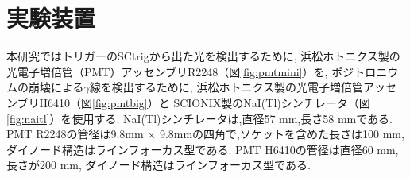 \section{実験装置}

本研究ではトリガーのSCtrigから出た光を検出するために,
浜松ホトニクス製の光電子増倍管（PMT）アッセンブリR2248（図\ref{fig:pmtmini}）を,
ポジトロニウムの崩壊による$\gamma$線を検出するために,
浜松ホトニクス製の光電子増倍管アッセンブリH6410（図\ref{fig:pmtbig}）と
SCIONIX製のNaI(Tl)シンチレータ（図\ref{fig:naitl}）を使用する.
NaI(Tl)シンチレータは,直径57 mm,長さ58 mmである.
PMT R2248の管径は9.8mm $\times$ 9.8mmの四角で,ソケットを含めた長さは100 mm,
ダイノード構造はラインフォーカス型である.
PMT H6410の管径は直径60 mm,長さが200 mm,
ダイノード構造はラインフォーカス型である.

